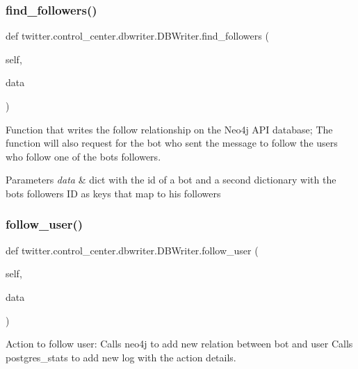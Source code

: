 \subsubsection{\texorpdfstring{find\+\_\+followers()}{find\_followers()}}
{\footnotesize\ttfamily def twitter.\+control\+\_\+center.\+dbwriter.\+D\+B\+Writer.\+find\+\_\+followers (\begin{DoxyParamCaption}\item[{}]{self,  }\item[{}]{data }\end{DoxyParamCaption})}



Function that writes the follow relationship on the Neo4j A\+PI database; The function will also request for the bot who sent the message to follow the users who follow one of the bot\textquotesingle{}s followers. 


\begin{DoxyParams}{Parameters}
{\em data} & dict with the id of a bot and a second dictionary with the bot\textquotesingle{}s followers\textquotesingle{} ID as keys that map to his followers \\
\hline
\end{DoxyParams}
\mbox{\label{classtwitter_1_1control__center_1_1dbwriter_1_1DBWriter_a59e9de0b9462c07bc173e160c3431e5a}} 
\subsubsection{\texorpdfstring{follow\+\_\+user()}{follow\_user()}}
{\footnotesize\ttfamily def twitter.\+control\+\_\+center.\+dbwriter.\+D\+B\+Writer.\+follow\+\_\+user (\begin{DoxyParamCaption}\item[{}]{self,  }\item[{}]{data }\end{DoxyParamCaption})}



Action to follow user\+: Calls neo4j to add new relation between bot and user Calls postgres\+\_\+stats to add new log with the action details. 


